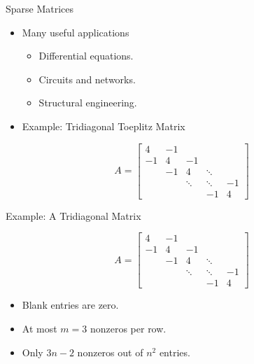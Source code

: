 \documentclass[10pt]{beamer}
\begin{document}

\begin{frame}{Sparse Matrices}


\begin{itemize}
    \item Many useful applications
    \begin{itemize}
        \item Differential equations.
        \item Circuits and networks.
        \item Structural engineering.
    \end{itemize}

 \item Example: Tridiagonal Toeplitz Matrix
\end{itemize}
\[
A=
\begin{bmatrix}
4  & -1 &    &        &   \\
-1 & 4  & -1 &        &   \\
   & -1 & 4  & \ddots &   \\
   &    & \ddots & \ddots & -1\\
   &    &        & -1 & 4
\end{bmatrix}
\]

\end{frame}


\begin{frame}{Example: A Tridiagonal Matrix}

\[
A=
\begin{bmatrix}
4  & -1 &    &        &   \\
-1 & 4  & -1 &        &   \\
   & -1 & 4  & \ddots &   \\
   &    & \ddots & \ddots & -1\\
   &    &        & -1 & 4
\end{bmatrix}
\]

\begin{itemize}
    \item Blank entries are zero.
    \item At most $m=3$ nonzeros per row.
    \item Only $3n-2$ nonzeros out of $n^2$ entries.
\end{itemize}


\end{frame}
\end{document}
